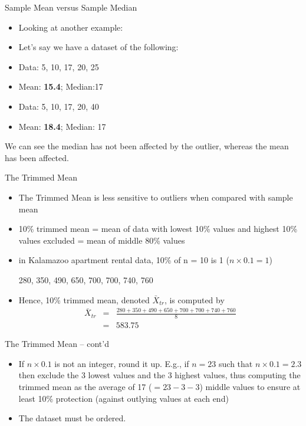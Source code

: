 \documentclass[14pt]{beamer}\usepackage[]{graphicx}\usepackage[]{color}
\begin{document}
\begin{frame}[fragile]{Sample Mean versus Sample Median}

\begin{itemize}
\item Looking at another example:
\item Let's say we have a dataset of the following:  
\item Data: 5, 10, 17, 20, 25
\item Mean: \textbf{15.4}; Median:17
\item Data: 5, 10, 17, 20, 40
\item Mean: \textbf{18.4};  Median: 17
\end{itemize}

We can see the median has not been affected by the outlier, whereas the  mean has been affected.

\end{frame}

\begin{frame}[fragile]{The Trimmed Mean}


{\small{
\begin{itemize}
\item<1-> The Trimmed Mean is less sensitive to outliers when compared with sample mean  
\item<2-> 10\% trimmed mean = mean of data with lowest 10\% values and  highest 10\% values excluded = mean of middle 80\% values
\item<3-> in Kalamazoo apartment rental data, 10\% of n = 10 is 1 ($n \times 0.1 = 1$)

280, 350, 490, 650, 700, 700, 740, 760
\item<4-> Hence, 10\% trimmed mean, denoted $\bar{X}_{tr}$, is computed by
\begin{eqnarray*}
\bar{X}_{tr} &=& \frac{280+350+490+650+700+700+740+760}{8} \\
     &=&583.75
\end{eqnarray*}
\end{itemize}
}}
\end{frame}

\begin{frame}[fragile]{The Trimmed Mean -- cont'd}

\begin{itemize}
\item<1-> If $n \times 0.1$ is not an integer, round it up. E.g., if $n = 23$ such that  $n \times 0.1 = 2.3$ then exclude the 3 lowest values and the 3 highest values, thus computing the trimmed mean as the  average of 17 ($= 23 - 3 - 3$) middle values to ensure at least  10\% protection (against outlying values at each end)

\item<2-> The dataset must be ordered.
\end{itemize}

\end{frame}
\end{document}
